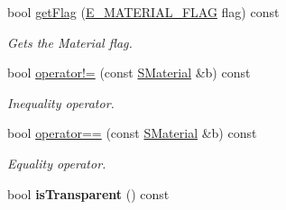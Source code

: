 \begin{DoxyCompactItemize}
bool \hyperlink{classirr_1_1video_1_1SMaterial_ab8b10dbd364b03745e6708a41b59e9e9}{get\+Flag} (\hyperlink{namespaceirr_1_1video_a8a3bc00ae8137535b9fbc5f40add70d3}{E\+\_\+\+M\+A\+T\+E\+R\+I\+A\+L\+\_\+\+F\+L\+AG} flag) const 
\begin{DoxyCompactList}\small\item\em Gets the Material flag. \end{DoxyCompactList}\item 
bool \hyperlink{classirr_1_1video_1_1SMaterial_aa509d4f4822d3321aa400bfd8d767d10}{operator!=} (const \hyperlink{classirr_1_1video_1_1SMaterial}{S\+Material} \&b) const 
\begin{DoxyCompactList}\small\item\em Inequality operator. \end{DoxyCompactList}\item 
bool \hyperlink{classirr_1_1video_1_1SMaterial_ad6427ceb4e1a89a186aeb5030756c32c}{operator==} (const \hyperlink{classirr_1_1video_1_1SMaterial}{S\+Material} \&b) const 
\begin{DoxyCompactList}\small\item\em Equality operator. \end{DoxyCompactList}\item 
bool {\bfseries is\+Transparent} () const \hypertarget{classirr_1_1video_1_1SMaterial_ac2bee0b84bfbc0b17571574ea914ca8a}{}\label{classirr_1_1video_1_1SMaterial_ac2bee0b84bfbc0b17571574ea914ca8a}

\end{DoxyCompactItemize}
